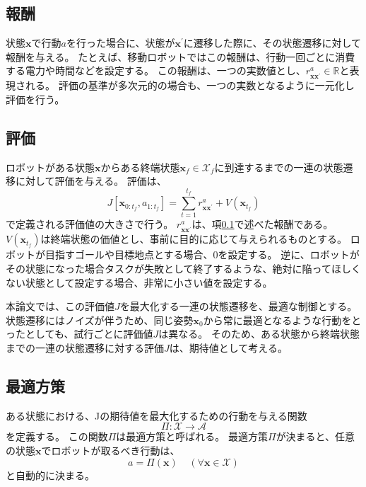 \subsection{報酬} \label{subsection:reward}
状態$\bm{x}$で行動$a$を行った場合に、状態が$\bm{x}^{'}$に遷移した際に、その状態遷移に対して報酬を与える。
たとえば、移動ロボットではこの報酬は、行動一回ごとに消費する電力や時間などを設定する。
この報酬は、一つの実数値とし、$r^{a}_{\bm{x}\bm{x}^{'}} \in \mathbb{R}$と表現される。
評価の基準が多次元的の場合も、一つの実数となるように一元化し評価を行う。

\subsection{評価}
ロボットがある状態$\bm{x}$からある終端状態$\bm{x}_{f} \in \mathcal{X}_{f}$に到達するまでの一連の状態遷移に対して評価を与える。
評価は、
\begin{equation}
\label{evaluation}
  J[ \bm{x}_{0:t_{f}}, a_{1:t_{f}} ] = \sum^{t_{f}}_{t=1} r^{a}_{\bm{x}\bm{x}^{'}} + V(\bm{x}_{t_{f}})
\end{equation}
で定義される評価値の大きさで行う。
$r^{a}_{\bm{x}\bm{x}^{'}}$は、項\ref{subsection:reward}で述べた報酬である。
$V(\bm{x}_{t_{f}})$は終端状態の価値とし、事前に目的に応じて与えられるものとする。
ロボットが目指すゴールや目標地点とする場合、$0$を設定する。
逆に、ロボットがその状態になった場合タスクが失敗として終了するような、絶対に陥ってほしくない状態として設定する場合、非常に小さい値を設定する。

本論文では、この評価値$J$を最大化する一連の状態遷移を、最適な制御とする。
状態遷移にはノイズが伴うため、同じ姿勢$\bm{x}_{0}$から常に最適となるような行動をとったとしても、試行ごとに評価値$J$は異なる。
そのため、ある状態から終端状態までの一連の状態遷移に対する評価$J$は、期待値として考える。

\subsection{最適方策}
ある状態における、Jの期待値を最大化するための行動を与える関数
\begin{equation}
\label{policy}
  \Pi : \mathcal{X} \rightarrow \mathcal{A}
\end{equation}
を定義する。
この関数$\Pi$は最適方策と呼ばれる。
最適方策$\Pi$が決まると、任意の状態$\bm{x}$でロボットが取るべき行動は、
\begin{equation}
\label{oprimal action}
  a = \Pi(\bm{x}) \;\;\;\; (\forall \bm{x} \in \mathcal{X})
\end{equation}
と自動的に決まる。

